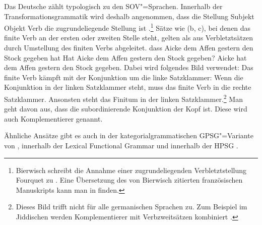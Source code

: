 Das Deutsche zählt typologisch zu den SOV"=Sprachen. Innerhalb der
Transformationsgrammatik 
wird deshalb angenommen, dass die Stellung Subjekt Objekt Verb die zugrundeliegende Stellung ist \parencites{Bach62a}[]{Bierwisch63a}{Reis74a}[Kapitel~1]{Thiersch78a}.\footnote{%
  Bierwisch schreibt die Annahme einer zugrundeliegenden Verbletztstellung Fourquet
  zu \citep{Fourquet57a}. Eine Übersetzung des von Bierwisch zitierten
  französischen Manuskripts kann man in 
  finden.%
}
Sätze wie (b, c), bei denen das finite Verb an der ersten oder zweiten Stelle steht,
gelten als aus Verbletztsätzen durch Umstellung des finiten Verbs abgeleitet.
\eal
\ex dass Aicke dem Affen gestern den Stock gegeben hat
\ex Hat Aicke dem Affen gestern den Stock gegeben?
\ex Aicke hat dem Affen gestern den Stock gegeben.
\zl
Dabei wird folgendes Bild verwendet: Das finite Verb kämpft mit der Konjunktion um die linke Satzklammer:
Wenn die Konjunktion in der linken Satzklammer steht, muss das finite Verb in die rechte Satzklammer.
Ansonsten steht das Finitum in der linken Satzklammer.\footnote{
  Dieses Bild trifft nicht für alle germanischen Sprachen zu. Zum Beispiel im Jiddischen werden
  Komplementierer mit Verbzweitsätzen kombiniert \citep[]{Diesing2004a}.
} Man geht davon aus, dass die subordinierende Konjunktion
der Kopf ist. Diese wird auch Komplementierer genannt.

Ähnliche Ansätze gibt es auch in der kategorialgrammatischen GPSG"=Variante von \citet[]{Jacobs86a}, innerhalb der Lexical Functional Grammar \citep{Berman96a-u} und innerhalb der HPSG
\label{Seite-V1-via-Lexikonregel}\parencites{KW91a}{Oliva92b}{Netter92}{Frank94}{Kiss95a}{Feldhaus97}{Meurers2000b}{Mueller2005c,MuellerGS}.\addpages

